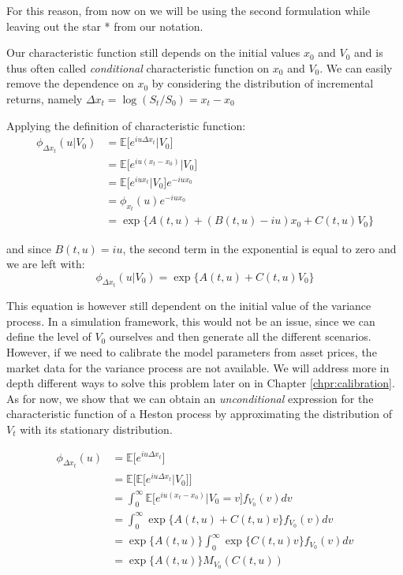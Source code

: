 For this reason, from now on we will be using the second formulation while leaving out the star * from our notation.

\bigskip


Our characteristic function still depends on the initial values $x_0$ and  $V_0$ and is thus often called \textit{conditional} characteristic function on $x_0$ and $V_0$.
We can easily remove the dependence on $x_0$ by considering the distribution of incremental returns, namely $\Delta x_t = \log (S_t / S_0) = x_t - x_0$

Applying the definition of characteristic function:
\begin{equation*}
	\begin{split}
	\phi_{\Delta x_t}(u|V_0) &= \mathbb{E}\big[e^{i u \Delta x_t} |V_0\big] \\
	&=  \mathbb{E}\big[e^{i u ( x_t - x_0)}|V_0\big]\\
	&= \mathbb{E}\big[e^{i u x_t}|V_0\big] e^{-i u x_0}\\
	&= \phi_{x_t}(u) e^{-i u x_0}\\
	&= \exp\{A(t,u) + (B(t,u) - iu) x_0 + C(t,u) V_0\}
	\end{split}
\end{equation*}

and since $B(t,u)  = i u$, the second term in the exponential is equal to zero and we are left with:
\begin{equation}
\label{eq:chf_V0}
\phi_{\Delta x_t}(u|V_0) =  \exp\{A(t,u) + C(t,u) V_0\}
\end{equation}




This equation is however still dependent on the initial value of the variance process. In a simulation framework, this would not be an issue, since we can define the level of $V_0$ ourselves and then generate all the different scenarios. However, if we need to calibrate the model parameters from asset prices, the market data for the variance process are not available. We will address more in depth different ways to solve this problem later on in Chapter \ref{chpr:calibration}. As for now, we show that we can obtain an \textit{unconditional} expression for the characteristic function of a Heston process by approximating the distribution of $V_t$ with its stationary distribution.

\begin{equation*}
\begin{split}
	\phi_{\Delta x_t}(u) &= \mathbb{E}\big[e^{i u \Delta x_t} \big] \\
	&= \mathbb{E}\big[ \mathbb{E}\big[ e^{i u \Delta x_t} | V_0\big] \big]\\
	&=  \int_{0}^{\infty} \mathbb{E}\big[e^{i u ( x_t - x_0)}|V_0 = v \big] f_{V_0}(v) dv \\
	&= \int_{0}^{\infty} \exp\{A(t,u) + C(t,u) v\} f_{V_0}(v) dv \\
	&=  \exp\{A(t,u)\} \int_{0}^{\infty}  \exp \{C(t,u) v\} f_{V_0}(v) dv\\
	&= \exp\{A(t,u) \} M_{V_0}(C(t,u))
\end{split}
\end{equation*}

